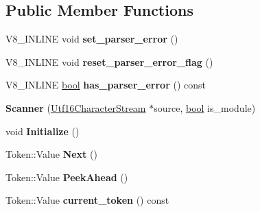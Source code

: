 \subsection*{Public Member Functions}
\begin{DoxyCompactItemize}
\item 
\mbox{\label{classv8_1_1internal_1_1Scanner_aa40988dd00a83fd2792ede63e0eb92db}} 
V8\+\_\+\+I\+N\+L\+I\+NE void {\bfseries set\+\_\+parser\+\_\+error} ()
\item 
\mbox{\label{classv8_1_1internal_1_1Scanner_a9b56b012c3fdddf538c275a016b85ace}} 
V8\+\_\+\+I\+N\+L\+I\+NE void {\bfseries reset\+\_\+parser\+\_\+error\+\_\+flag} ()
\item 
\mbox{\label{classv8_1_1internal_1_1Scanner_a5307ba40abbaa60c7bc0fa9f27818182}} 
V8\+\_\+\+I\+N\+L\+I\+NE \mbox{\hyperlink{classbool}{bool}} {\bfseries has\+\_\+parser\+\_\+error} () const
\item 
\mbox{\label{classv8_1_1internal_1_1Scanner_acd01e5666a3da7344b6b0633af87a567}} 
{\bfseries Scanner} (\mbox{\hyperlink{classv8_1_1internal_1_1Utf16CharacterStream}{Utf16\+Character\+Stream}} $\ast$source, \mbox{\hyperlink{classbool}{bool}} is\+\_\+module)
\item 
\mbox{\label{classv8_1_1internal_1_1Scanner_ab8c92995c0ed8e8e5da4358586b1222e}} 
void {\bfseries Initialize} ()
\item 
\mbox{\label{classv8_1_1internal_1_1Scanner_a076d7ff22f3c1a4301512c356991eeb0}} 
Token\+::\+Value {\bfseries Next} ()
\item 
\mbox{\label{classv8_1_1internal_1_1Scanner_a6a9f69460d1377154b182f52584477e3}} 
Token\+::\+Value {\bfseries Peek\+Ahead} ()
\item 
\mbox{\label{classv8_1_1internal_1_1Scanner_a528a97cfcdbf505127268f0c032bf119}} 
Token\+::\+Value {\bfseries current\+\_\+token} () const
\item 
\mbox{\label{classv8_1_1internal_1_1Scanner_a7f8f4c83f8c06c558f9df6b5c2f3a307}} 

\end{DoxyCompactItemize}
